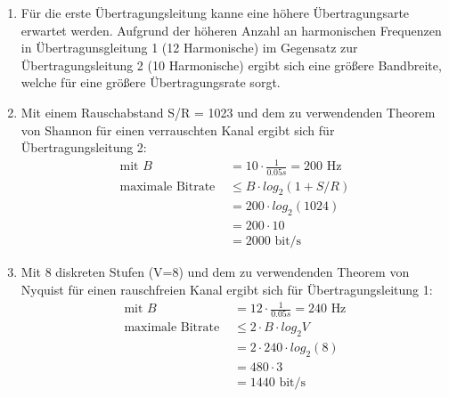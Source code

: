 \documentclass[12pt]{scrartcl}
\begin{document}
\setcounter{exnum}{3}
    \begin{enumerate}[label=(\alph*)]
        \item   Für die erste Übertragungsleitung kanne eine höhere Übertragungsarte erwartet werden. Aufgrund der höheren Anzahl an harmonischen
                Frequenzen in Übertragunsgleitung 1 (12 Harmonische) im Gegensatz zur Übertragungsleitung 2 (10 Harmonische) ergibt sich eine größere Bandbreite,
                welche für eine größere Übertragungsrate sorgt.
        \item   Mit einem Rauschabstand S/R = 1023 und dem zu verwendenden Theorem von Shannon für einen verrauschten Kanal ergibt sich 
                für Übertragungsleitung 2: 
            \begin{align*}
                \text{mit } B &= 10 \cdot \frac{1}{0.05 s} = 200 \text{ Hz} \\
                \text{maximale Bitrate } &\leq B \cdot log_{2} (1+ S/R) \\
                &= 200 \cdot log_{2}(1024) \\
                &= 200 \cdot 10 \\
                &= 2000 \text{ bit/s}
            \end{align*}
        \item Mit 8 diskreten Stufen (V=8) und dem zu verwendenden Theorem von Nyquist für einen rauschfreien Kanal ergibt sich für Übertragungsleitung 1: 
            \begin{align*}
                \text{mit } B &= 12 \cdot \frac{1}{0.05 s} = 240 \text{ Hz}\\
                \text{maximale Bitrate } &\leq 2 \cdot B \cdot log_{2} V \\
                &= 2 \cdot 240 \cdot log_{2}(8) \\
                &= 480 \cdot 3 \\
                &= 1440 \text{ bit/s}\\
            \end{align*}
    \end{enumerate}
\end{document}
